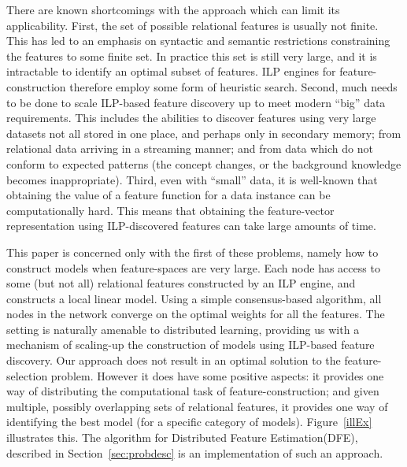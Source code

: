 There are known shortcomings with the approach which can limit its
applicability. First, the set of possible relational features
is usually not finite. This has led to an emphasis on syntactic and
semantic restrictions constraining the features to some finite set. In practice
this set is still very large, and it is intractable to identify an optimal
subset of features. ILP engines for feature-construction therefore employ some form
of heuristic search.
Second, much needs to be done to scale ILP-based feature discovery
up to meet modern ``big'' data requirements. This includes the abilities to
discover features using very large datasets not all stored in one place,
and perhaps only in secondary memory; from relational data arriving in a streaming manner;
and from data which do not conform to expected patterns (the concept changes, or
the background knowledge becomes inappropriate).
Third, even with ``small'' data, it is well-known that obtaining the
value of a feature function for a data instance can be computationally hard.
This means that obtaining the feature-vector representation using ILP-discovered
features can take large amounts of time.

This paper is concerned only with the first of these problems, namely how to construct
models when feature-spaces are very large.
Each node has access to some (but not all)
relational features constructed by an ILP
engine, and constructs a local linear model.
Using a simple consensus-based algorithm, all nodes in the network converge on
the optimal weights for all the features. The setting is naturally amenable to
distributed learning, providing us with a mechanism of scaling-up the construction
of models using ILP-based feature discovery. Our approach does not result in an optimal solution
to the feature-selection problem. However it does have some positive aspects: it provides one
way of distributing the computational task of feature-construction; and given multiple, possibly overlapping sets of
relational features, it provides one way of identifying the best model (for a specific category of models).
Figure~\ref{illEx} illustrates this. The algorithm for Distributed Feature Estimation(DFE), described in
Section~\ref{sec:probdesc} is an implementation of such an approach.
%


